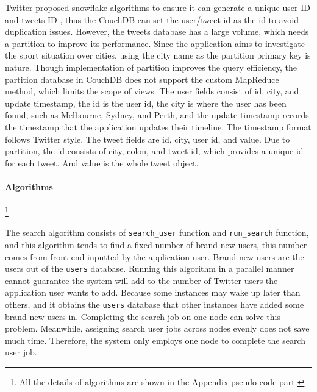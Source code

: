 Twitter proposed snowflake algorithms to ensure it can generate a unique user ID and tweets ID \cite{10.5555/110778.110783} \cite{10.5555/70413.70419}, thus the CouchDB can set the user/tweet id as the id to avoid duplication issues. However, the tweets database has a large volume, which needs a partition to improve its performance. Since the application aims to investigate the sport situation over cities, using the city name as the partition primary key is nature. Though implementation of partition improves the query efficiency, the partition database in CouchDB does not support the custom MapReduce method, which limits the scope of views.
The user fields consist of id, city, and update timestamp, the id is the user id, the city is where the user has been found, such as Melbourne, Sydney, and Perth, and the update timestamp records the timestamp that the application updates their timeline. The timestamp format follows Twitter style.
The tweet fields are id, city, user id, and value. Due to partition, the id consists of city, colon, and tweet id, which provides a unique id for each tweet. And value is the whole tweet object.


\paragraph{Algorithms}\footnote{All the details of algorithms are shown in the Appendix pseudo code part.}

The search algorithm consists of \texttt{search_user} function and \texttt{run_search} function, and this algorithm tends to find a fixed number of brand new users, this number comes from front-end inputted by the application user. Brand new users are the users out of the \texttt{users} database. Running this algorithm in a parallel manner cannot guarantee the system will add to the number of Twitter users the application user wants to add. Because some instances may wake up later than others, and it obtains the  \texttt{users} database that other instances have added some brand new users in. Completing the search job on one node can solve this problem. Meanwhile, assigning search user jobs across nodes evenly does not save much time. Therefore, the system only employs one node to complete the search user job.

